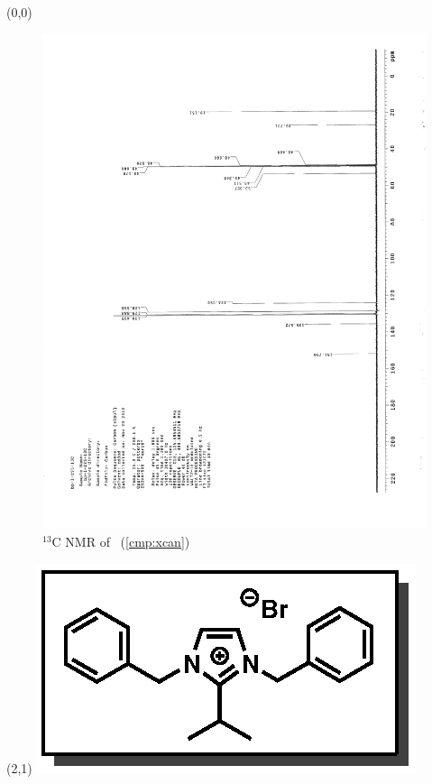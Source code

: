 \clearpage
\begin{textblock}{20}(0,0)
\begin{figure}[htb]
\caption{$^{13}$C NMR of  \CMPxcan\ (\ref{cmp:xcan})}
\includegraphics[scale=0.75, trim = 0mm 0mm 0mm 5mm,
clip]{chp_alkylation/images/nmr/xcanC}
\vspace{-100pt}
\end{figure}
\end{textblock}
\begin{textblock}{1}(2,1)
\includegraphics[scale=0.8, angle=90]{chp_alkylation/images/xcan}
\end{textblock}
\clearpage

